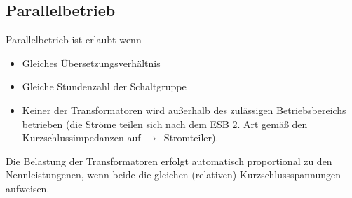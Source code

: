\documentclass[a4paper, 11pt]{article}
\begin{document}
\subsection*{Parallelbetrieb}
\rmfamily
Parallelbetrieb ist erlaubt wenn
\begin{itemize}
\item Gleiches Übersetzungsverhältnis
\item Gleiche Stundenzahl der Schaltgruppe
\item Keiner der Transformatoren wird außerhalb des zulässigen Betriebsbereichs betrieben (die Ströme teilen sich nach dem ESB 2. Art gemäß den Kurzschlussimpedanzen auf \mbox{$\rightarrow$ Stromteiler}).
\end{itemize}
Die Belastung der Transformatoren erfolgt automatisch proportional zu den Nennleistungenen, wenn beide die gleichen (relativen) Kurzschlussspannungen aufweisen.
\end{document}
